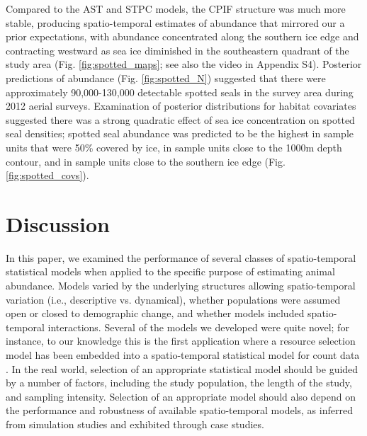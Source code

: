 \documentclass[12pt,english]{article}
\begin{document}
\begin{spacing}{1.9}
Compared to the AST and STPC models, the CPIF structure was much more stable, producing spatio-temporal estimates of abundance that mirrored our a prior expectations, with abundance concentrated along the southern ice edge and contracting westward as sea ice diminished in the southeastern quadrant of the study area (Fig. \ref{fig:spotted_maps}; see also the video in Appendix S4).  Posterior predictions of abundance (Fig. \ref{fig:spotted_N}) suggested that there were approximately 90,000-130,000 detectable spotted seals in the survey area during 2012 aerial surveys.  Examination of posterior distributions for habitat covariates suggested there was a strong quadratic effect of sea ice concentration on spotted seal densities; spotted seal abundance was predicted to be the highest in sample units that were 50\% covered by ice, in sample units close to the 1000m depth contour, and in sample units close to the southern ice edge (Fig. \ref{fig:spotted_covs}).

\section{Discussion}

In this paper, we examined the performance of several classes of spatio-temporal statistical models when applied to the specific purpose of estimating animal abundance.  Models varied by the underlying structures allowing spatio-temporal variation (i.e., descriptive vs. dynamical), whether populations were assumed open or closed to demographic change, and whether models included spatio-temporal interactions.  Several of the models we developed were quite novel; for instance, to our knowledge this is the first application where a resource selection model has been embedded into a spatio-temporal statistical model for count data \citep[although see][for an example integrating resource selection into capture-recapture models]{RoyleEtAl2013}.  In the real world, selection of an appropriate statistical model should be guided by a number of factors, including the study population, the length of the study, and sampling intensity.  Selection of an appropriate model should also depend on the performance and robustness of available spatio-temporal models, as inferred from simulation studies and exhibited through case studies.


\end{spacing}
\end{document}
